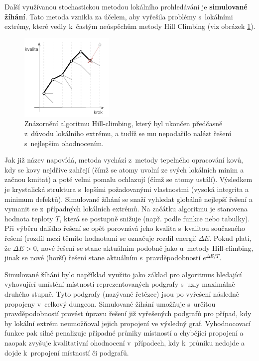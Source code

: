 \par
Další využívanou stochastickou metodou lokálního prohledávání je \textbf{simulované žíhání}.
Tato metoda vznikla za účelem, aby vyřešila problémy s~lokálními extrémy, které vedly k~častým neúspěchům metody Hill Climbing (viz obrázek \ref{img:hill_climbing2}).
\begin{figure}[hbt]
    \centering
    \includegraphics[width=0.4\textwidth]{obrazky/hill_climbing2.pdf}
    \caption{Znázornění algoritmu Hill-climbing, který byl ukončen předčasně z~důvodu lokálního extrému, a tudíž se mu nepodařilo nalézt řešení s~nejlepším ohodnocením.}
    \label{img:hill_climbing2}
\end{figure}
Jak již název napovídá, metoda vychází z~metody tepelného opracování kovů, kdy se kovy nejdříve zahřejí (čímž se atomy uvolní ze svých lokálních minim a začnou kmitat) a poté velmi pomalu ochlazují (čímž se atomy ustálí).
Výsledkem je krystalická struktura s~lepšími požadovanými vlastnostmi (vysoká integrita a minimum defektů).
Simulované žíhání se snaží vyhledat globálně nejlepší řešení a vymanit se z~případných lokálních extrémů.
Na začátku algoritmu je stanovena hodnota teploty $T$, která se postupně snižuje (např. podle funkce nebo tabulky).
Při výběru dalšího řešení se opět porovnává jeho kvalita s~kvalitou současného řešení (rozdíl mezi těmito hodnotami se označuje rozdíl energií $\Delta E$.
Pokud platí, že $\Delta E > 0$, nové řešení se stane aktuálním podobně jako u~metody Hill-climbing, jinak se nové (horší) řešení stane aktuálním s~pravděpodobností $e^{\Delta E/T}$\cite{lit:simul_anneal}.
\par
Simulované žíhání bylo například využito jako základ pro algoritmus hledající vyhovující umístění místností reprezentovaných podgrafy s~uzly maximálně druhého stupně.
Tyto podgrafy (nazývané řetězce) jsou po vyřešení následně propojeny v~celkový dungeon.
Simulované žíhání umožňuje s~určitou pravděpodobností provést úpravu řešení již vyřešených podgrafů pro případ, kdy by lokální extrém neumožňoval jejich propojení ve výsledný graf.
Vyhodnocovací funkce pak silně penalizuje případné průniky místností a chybějící propojení a naopak zvyšuje kvalitativní ohodnocení v~případech, kdy k~průniku nedojde a dojde k~propojení místností či podgrafů\cite{lit:dung_simul_anneal}.
